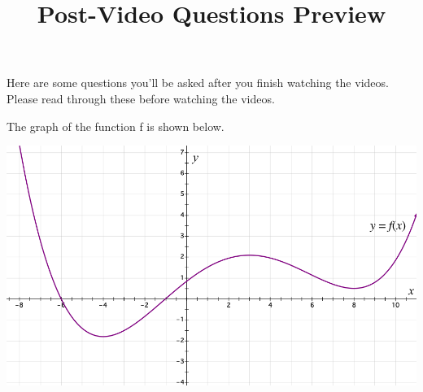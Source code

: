\documentclass[handout]{ximera}
\title{Post-Video Questions Preview}
\begin{document}
\begin{abstract}
\end{abstract}


\maketitle

Here are some questions you’ll be asked after you finish watching the videos. Please read through these before watching the videos.


The graph of the function f is shown below.

\begin{image}
\includegraphics{Picture2.png}
\end{image}
\end{document}
